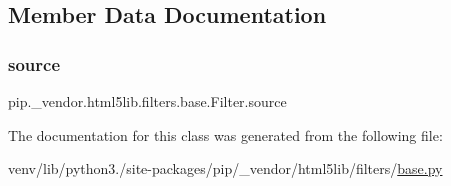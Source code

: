 \subsection{Member Data Documentation}
\mbox{\label{classpip_1_1__vendor_1_1html5lib_1_1filters_1_1base_1_1Filter_aedf7f8b39d6bd2b443f81db8fcc14060}} 
\subsubsection{\texorpdfstring{source}{source}}
{\footnotesize\ttfamily pip.\+\_\+vendor.\+html5lib.\+filters.\+base.\+Filter.\+source}



The documentation for this class was generated from the following file\+:\begin{DoxyCompactItemize}
\item 
venv/lib/python3./site-\/packages/pip/\+\_\+vendor/html5lib/filters/\hyperlink{__vendor_2html5lib_2filters_2base_8py}{base.\+py}\end{DoxyCompactItemize}
